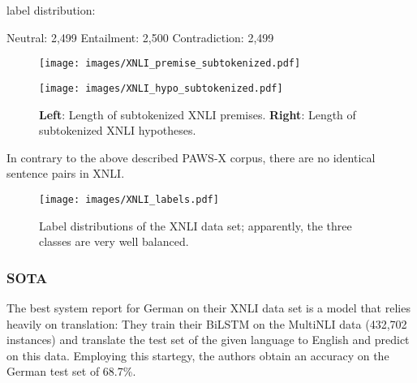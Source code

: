 


label distribution:

Neutral: 2,499
Entailment: 2,500
Contradiction: 2,499

\begin{figure}
  \begin{minipage}{0.45\linewidth}
  \vspace{0pt}
    \texttt{[image: images/XNLI\_premise\_subtokenized.pdf]}
  \end{minipage}
  \hfill
  \begin{minipage}{0.45\linewidth}
  \vspace{0pt}
    \texttt{[image: images/XNLI\_hypo\_subtokenized.pdf]}
  \end{minipage}
  \caption[XNLI Lengths]{\textbf{Left}: Length of subtokenized XNLI premises. \textbf{Right}: Length of subtokenized XNLI hypotheses.}
\end{figure}


In contrary to the above described PAWS-X corpus, there are no identical sentence pairs in XNLI.

\begin{wrapfigure}{r}{0.55\linewidth}
  \begin{center}
    \texttt{[image: images/XNLI\_labels.pdf]}
  \end{center}
  \caption[XNLI labels]{Label distributions of the XNLI data set; apparently, the three classes are very well balanced.}
\end{wrapfigure}

\subsubsection{SOTA}

The best system \cite{conneau2018xnli} report for German on their XNLI data set is a model that
relies heavily on translation:
They train their BiLSTM on the MultiNLI data (432,702 instances) and translate the test set of the
given language to English and predict on this data.
Employing this startegy, the authors obtain an accuracy on the German test set of 68.7\%.



